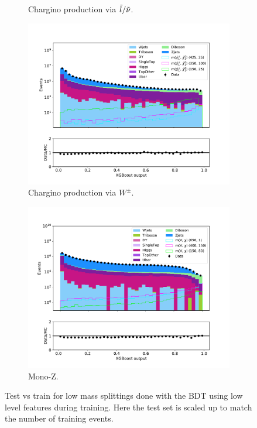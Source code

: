 \begin{figure}[H]
\begin{subfigure}[t!]{0.49\textwidth}
        \caption{Chargino production via $\Tilde{l}/\Tilde{\nu}$.}
        \label{fig:}
    \end{subfigure}      
    \begin{subfigure}[t!]{0.49\textwidth}
        \includegraphics[width = \textwidth]{Figures/Stacked/stackedplot_BDT_Low_level_WW.pdf}
        \caption{Chargino production via $W^\pm$.}
        \label{fig:}
    \end{subfigure}
    \begin{subfigure}[t!]{0.49\textwidth}
        \includegraphics[width = \textwidth]{Figures/Stacked/stackedplot_BDT_Low_level_monoZ.pdf}
        \caption{Mono-Z.}
        \label{fig:}
    \end{subfigure}
    \caption{Test vs train for low mass splittings done with the BDT using low level features during training. Here the test set is scaled up to match the number of training events.}
    \label{fig:}
\end{figure}

